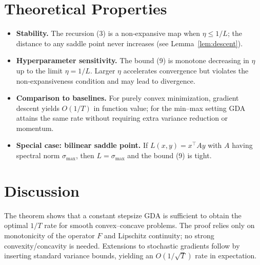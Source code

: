 \documentclass{article}
\newcommand{\F}{F}
\begin{document}
\section*{Theoretical Properties}
\begin{itemize}
\item \textbf{Stability.} The recursion (3) is a non‑expansive map when $\eta\le 1/L$; the distance to any saddle point never increases (see Lemma~\ref{lem:descent}).
\item \textbf{Hyperparameter sensitivity.} The bound (9) is monotone decreasing in $\eta$ up to the limit $\eta=1/L$. Larger $\eta$ accelerates convergence but violates the non‑expansiveness condition and may lead to divergence.
\item \textbf{Comparison to baselines.} For purely convex minimization, gradient descent yields $O(1/T)$ in function value; for the min–max setting GDA attains the same rate without requiring extra variance reduction or momentum.
\item \textbf{Special case: bilinear saddle point.} If $L(x,y)=x^{\top}Ay$ with $A$ having spectral norm $\sigma_{\max}$, then $L=\sigma_{\max}$ and the bound (9) is tight.
\end{itemize}

\section*{Discussion}
The theorem shows that a constant stepsize GDA is sufficient to obtain the optimal $1/T$ rate for smooth convex–concave problems. The proof relies only on monotonicity of the operator $\F$ and Lipschitz continuity; no strong convexity/concavity is needed. Extensions to stochastic gradients follow by inserting standard variance bounds, yielding an $O(1/\sqrt{T})$ rate in expectation.
\end{document}
